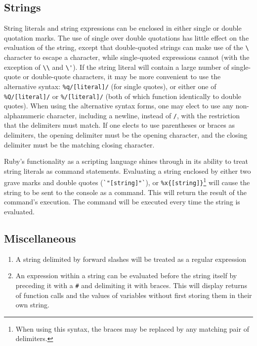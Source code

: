 \documentclass[12pt]{article}
\begin{document}
\subsection{Strings}

String literals and string expressions can be enclosed in either single or double quotation marks. The use of single over double quotations has little effect on the evaluation of the string, except that double-quoted strings can make use of the \verb|\| character to escape a character, while single-quoted expressions cannot (with the exception of \verb|\\| and \verb|\'|). If the string literal will contain a large number of single-quote or double-quote characters, it may be more convenient to use the alternative syntax: \verb|%q/[literal]/| (for single quotes), or either one of \verb|%Q/[literal]/| or \verb|%/[literal]/| (both of which function identically to double quotes). When using the alternative syntax forms, one may elect to use any non-alphanumeric character, including a newline, instead of \verb|/|, with the restriction that the delimiters must match. If one elects to use parentheses or braces as delimiters, the opening delimiter must be the opening character, and the closing delimiter must be the matching closing character\cite{huihoo}.

Ruby's functionality as a scripting language shines through in its ability to treat string literals as command statements. Evaluating a string enclosed by either two grave marks and double quotes (\verb|`"[string]"`|), or \verb|%x{[string]}|\footnote{When using this syntax, the braces may be replaced by any matching pair of delimiters.} will cause the string to be sent to the console as a command. This will return the result of the command's execution. The command will be executed every time the string is evaluated\cite{huihoo}.

\subsection{Miscellaneous}
\begin{enumerate}
    \item{A string delimited by forward slashes will be treated as a regular expression}
    \item{An expression within a string can be evaluated before the string itself by preceding it with a \verb|#| and delimiting it with braces. This will display returns of function calls and the values of variables without first storing them in their own string.}
\end{enumerate}
\end{document}
